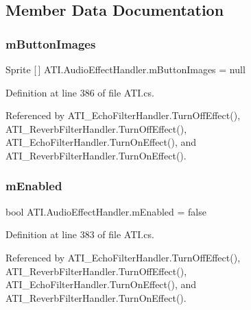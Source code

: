 \subsection{Member Data Documentation}
\mbox{\label{class_a_t_i_1_1_audio_effect_handler_a6e1cfd5449b82870eacd7404a158c7a7}} 
\subsubsection{\texorpdfstring{m\+Button\+Images}{mButtonImages}}
{\footnotesize\ttfamily Sprite \mbox{[}$\,$\mbox{]} A\+T\+I.\+Audio\+Effect\+Handler.\+m\+Button\+Images = null\hspace{0.3cm}{\ttfamily [protected]}}



Definition at line 386 of file A\+T\+I.\+cs.



Referenced by A\+T\+I\+\_\+\+Echo\+Filter\+Handler.\+Turn\+Off\+Effect(), A\+T\+I\+\_\+\+Reverb\+Filter\+Handler.\+Turn\+Off\+Effect(), A\+T\+I\+\_\+\+Echo\+Filter\+Handler.\+Turn\+On\+Effect(), and A\+T\+I\+\_\+\+Reverb\+Filter\+Handler.\+Turn\+On\+Effect().

\mbox{\label{class_a_t_i_1_1_audio_effect_handler_a378c463b827ad6e41d09a4ec2caff351}} 
\subsubsection{\texorpdfstring{m\+Enabled}{mEnabled}}
{\footnotesize\ttfamily bool A\+T\+I.\+Audio\+Effect\+Handler.\+m\+Enabled = false\hspace{0.3cm}{\ttfamily [protected]}}



Definition at line 383 of file A\+T\+I.\+cs.



Referenced by A\+T\+I\+\_\+\+Echo\+Filter\+Handler.\+Turn\+Off\+Effect(), A\+T\+I\+\_\+\+Reverb\+Filter\+Handler.\+Turn\+Off\+Effect(), A\+T\+I\+\_\+\+Echo\+Filter\+Handler.\+Turn\+On\+Effect(), and A\+T\+I\+\_\+\+Reverb\+Filter\+Handler.\+Turn\+On\+Effect().


